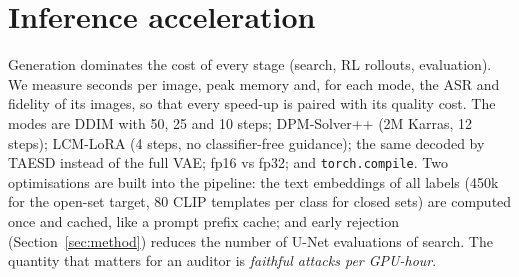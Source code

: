 \section{Inference acceleration}\label{sec:accel}
Generation dominates the cost of every stage (search, RL rollouts, evaluation). We measure seconds per image, peak
memory and, for each mode, the ASR and fidelity of its images, so that every speed-up is paired with its quality
cost. The modes are DDIM with 50, 25 and 10 steps; DPM-Solver++ (2M Karras, 12 steps); LCM-LoRA (4 steps, no
classifier-free guidance); the same decoded by TAESD instead of the full VAE; fp16 vs fp32; and
\texttt{torch.compile}. Two optimisations are built into the pipeline: the text embeddings of all labels
(450k for the open-set target, 80 CLIP templates per class for closed sets) are computed once and cached, like a
prompt prefix cache; and early rejection (Section~\ref{sec:method}) reduces the number of U-Net evaluations of
search. The quantity that matters for an auditor is \emph{faithful attacks per GPU-hour}.

